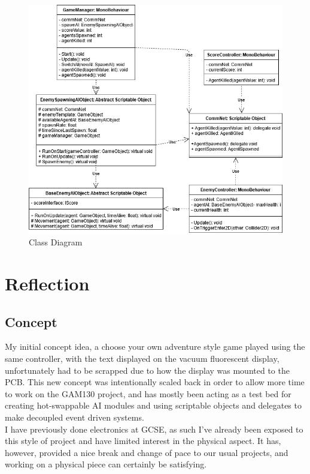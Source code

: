 \documentclass{article}
\begin{document}
    \begin{figure}[h!]
        \includegraphics[width = \linewidth]{Documentation Assets/ClassDiagram.jpg}
        \caption{Class Diagram}
    \end{figure}

    \newpage

    \section{Reflection}
        \subsection{Concept}
            My initial concept idea, a choose your own adventure style game played using the same controller, with the text displayed on the vacuum fluorescent display, unfortunately had to be scrapped due to how the display was mounted to the PCB. This new concept was intentionally scaled back in order to allow more time to work on the GAM130 project, and has mostly been acting as a test bed for creating hot-swappable AI modules and using scriptable objects and delegates to make decoupled event driven systems. \\
            I have previously done electronics at GCSE, as such I've already been exposed to this style of project and have limited interest in the physical aspect. It has, however, provided a nice break and change of pace to our usual projects, and working on a physical piece can certainly be satisfying.
\end{document}
